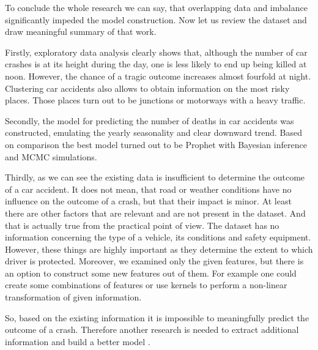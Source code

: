 To conclude the whole research we can say, that overlapping data and imbalance significantly impeded the model construction.
Now let us review the dataset and draw meaningful summary of that work.

Firstly, exploratory data analysis clearly shows that, although the number of car crashes is at its height during the day,
one is less likely to end up being killed at noon. 
However, the chance of a tragic outcome increases almost fourfold at night.
Clustering car accidents also allows to obtain information on the most risky places.
Those places turn out to be junctions or motorways with a heavy traffic.

Secondly, the model for predicting the number of deaths in car accidents was constructed,
emulating the yearly seasonality and clear downward trend.
Based on comparison the best model turned out to be Prophet with Bayesian inference and MCMC simulations.

Thirdly, as we can see the existing data is insufficient to determine the outcome of a car accident.
It does not mean, that road or weather conditions have no influence on the outcome of a crash,
but that their impact is minor. At least there are other factors that are relevant and are not present in the dataset.
And that is actually true from the practical point of view.
The dataset has no information concerning the type of a vehicle, its conditions and safety equipment.
However, these things are highly important as they determine the extent to which driver is protected.
Moreover, we examined only the given features, but there is an option to construct some new features out of them.
For example one could create some combinations of features or use kernels to perform a non-linear transformation of given information.

So, based on the existing information it is impossible to meaningfully predict the outcome of a crash.
Therefore another research is needed to extract additional information and build a better model .

